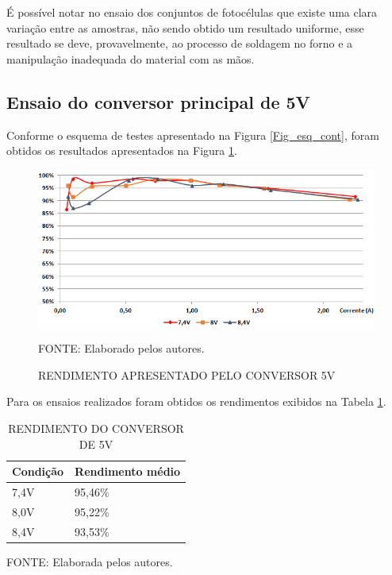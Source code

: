 \documentclass[
	12pt,				%
	openright,			%
	oneside,			%
	a4paper,			%
	english,			%
	french,				%
	spanish,			%
	brazil,				%
	oldfontcommands
	]{abntex2}
\begin{document}
	É possível notar no ensaio dos conjuntos de fotocélulas que existe uma clara variação entre as amostras, não sendo obtido um resultado uniforme, esse resultado se deve, provavelmente, ao processo de soldagem no forno e a manipulação inadequada do material com as mãos.
	
\subsection[Ensaio do conversor principal de 5V]{Ensaio do conversor principal de 5V}

	Conforme o esquema de testes apresentado na Figura \ref{Fig_esq_cont}, foram obtidos os resultados apresentados na Figura \ref{Fig_rend5}.
	
	\begin{figure}[th]
		\caption{RENDIMENTO APRESENTADO PELO CONVERSOR 5V}
		\label{Fig_rend5}
		\centering
		\includegraphics[width=0.9\linewidth]{./figs/rend5}
			
		\begin{small}
			FONTE: Elaborado pelos autores.
		\end{small}		
	\end{figure}
	
	
	Para os ensaios realizados foram obtidos os rendimentos exibidos na Tabela \ref{Tab_rend5}.
	
	\begin{table}[th]
	\caption{RENDIMENTO DO CONVERSOR DE 5V}
	\label{Tab_rend5}
	\centering
		\begin{tabular}{p{2cm}|p{4cm}}
			\textbf{Condição} & \textbf{Rendimento médio}\\
			\hline
			7,4V & 95,46\%\\
			8,0V & 95,22\%\\
			8,4V & 93,53\%\\
		\end{tabular}	
	
	\begin{small}
	\vspace{3pt}
		FONTE: Elaborada pelos autores.
	\end{small}
	\end{table}
	
\end{document}
